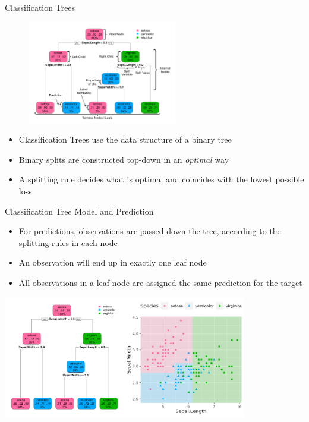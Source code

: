\documentclass[11pt,compress,t,notes=noshow, xcolor=table]{beamer}
\begin{document}
\begin{vbframe}{Classification Trees}
    \begin{figure}
    \centering
      \includegraphics[height = 4.5cm, keepaspectratio]{figure/cart_intro_annotated-tree.pdf}
    \end{figure}
  \begin{itemize}
    \item Classification Trees use the data structure of a binary tree
    \item Binary splits are constructed top-down in an \emph{optimal} way
    \item A splitting rule decides what is optimal and coincides with the lowest possible loss
  \end{itemize}
\end{vbframe}



\begin{vbframe}{Classification Tree Model and Prediction}
  \begin{itemize}
    \item For predictions, observations are passed down the tree, according to the splitting rules in each node
    \item An observation will end up in exactly one leaf node
    \item All observations in a leaf node are assigned the same prediction for the target
  \end{itemize}

\color{fgcolor}
{\centering \includegraphics[width=0.8\textwidth, keepaspectratio]{figure/tree-classif-depth3.pdf}

}

\end{vbframe}
\end{document}
